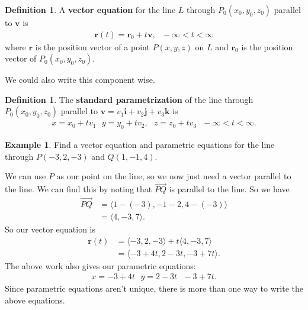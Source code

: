 \documentclass[12pt, letter]{article}
\theoremstyle{plain}
\numberwithin{theorem}{section}
\theoremstyle{definition}
\newtheorem{definition}[theorem]{Definition}
\newtheorem{example}[theorem]{Example}
\begin{document}
\begin{definition}
A \textbf{vector equation} for the line $L$ through $P_0(x_0,y_0,z_0)$ parallel to $\bm{v}$ is
\begin{align*}
\bm{r}(t) = \bm{r}_0+t\bm{v}, \ \ \ -\infty < t < \infty
\end{align*}
where $\bm{r}$ is the position vector of a point $P(x,y,z)$ on $L$ and $\bm{r}_0$ is the position vector of $P_0(x_0,y_0,z_0)$.
\end{definition}

\bigskip

We could also write this component wise.

\begin{definition}
The \textbf{standard parametrization} of the line through $P_0(x_0,y_0,z_0)$ parallel to $\bm{v} = v_1 \bm{i} + v_2\bm{j} + v_3\bm{k}$ is
\begin{align*}
x=x_0+tv_1 \ \ \ y=y_0+tv_2, \ \ \ z=z_0+tv_3 \ \ \ -\infty<t<\infty.
\end{align*}
\end{definition}

\bigskip

\hrulefill

\bigskip

\begin{example}
Find a vector equation and parametric equations for the line through $P(-3,2,-3)$ and $Q(1,-1,4)$.\\

\smallskip

We can use $P$ as our point on the line, so we now just need a vector parallel to the line. We can find this by noting that $\vec{PQ}$ is parallel to the line. So we have
\begin{align*}
\vec{PQ} &= \langle 1-(-3), -1-2, 4-(-3) \rangle\\
&= \langle 4, -3, 7 \rangle.
\end{align*}
So our vector equation is
\begin{align*}
\bm{r}(t) &= \langle -3, 2, -3 \rangle + t \langle 4, -3, 7 \rangle\\
&= \langle -3+4t, 2-3t, -3+7t \rangle.
\end{align*}
The above work also gives our parametric equations:
\begin{align*}
x= -3+4t \ \ \ y=2-3t \ \ \ -3+7t.
\end{align*}
Since parametric equations aren't unique, there is more than one way to write the above equations.
\end{example}
\end{document}
